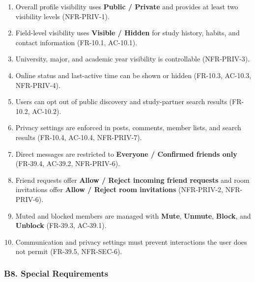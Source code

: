 \documentclass[12pt]{article}
\begin{document}
\begin{enumerate}
\item Overall profile visibility uses \textbf{Public / Private} and provides at least two visibility levels (NFR-PRIV-1).
\item Field-level visibility uses \textbf{Visible / Hidden} for study history, habits, and contact information (FR-10.1, AC-10.1).
\item University, major, and academic year visibility is controllable (NFR-PRIV-3).
\item Online status and last-active time can be shown or hidden (FR-10.3, AC-10.3, NFR-PRIV-4).
\item Users can opt out of public discovery and study-partner search results (FR-10.2, AC-10.2).
\item Privacy settings are enforced in posts, comments, member lists, and search results (FR-10.4, AC-10.4, NFR-PRIV-7).
\item Direct messages are restricted to \textbf{Everyone / Confirmed friends only} (FR-39.4, AC-39.2, NFR-PRIV-6).
\item Friend requests offer \textbf{Allow / Reject incoming friend requests} and room invitations offer \textbf{Allow / Reject room invitations} (NFR-PRIV-2, NFR-PRIV-6).
\item Muted and blocked members are managed with \textbf{Mute}, \textbf{Unmute}, \textbf{Block}, and \textbf{Unblock} (FR-39.3, AC-39.1).
\item Communication and privacy settings must prevent interactions the user does not permit (FR-39.5, NFR-SEC-6).
\end{enumerate}
\par\medskip

\hypertarget{sec:b8-special-requirements}{}
\subsubsection*{B8. Special Requirements}
\par\medskip
\end{document}
